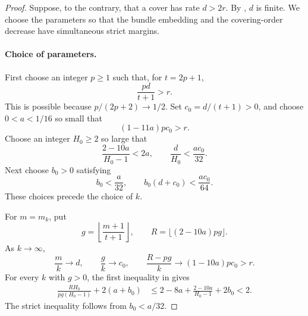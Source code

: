 \begin{proof}
Suppose, to the contrary, that a cover has rate $d>2r$.
By , $d$ is finite.  We choose the
parameters so that the bundle embedding and the covering-order
decrease have simultaneous strict margins.

\paragraph{Choice of parameters.}
First choose an integer $p\ge1$ such that, for $t=2p+1$,
\[
 \frac{pd}{t+1}>r.
\]
This is possible because $p/(2p+2)\to1/2$.  Set
$c_0=d/(t+1)>0$, and choose $0<a<1/16$ so small that
\begin{equation}
\label{eq:cover-a-choice}
 (1-11a)pc_0>r.
\end{equation}
Choose an integer $H_0\ge2$ so large that
\begin{equation}
\label{eq:cover-height-choice}
 \frac{2-10a}{H_0-1}<2a,
 \qquad
 \frac{d}{H_0}<\frac{ac_0}{32}.
\end{equation}
Next choose $b_0>0$ satisfying
\begin{equation}
\label{eq:cover-bad-choice}
 b_0<\frac{a}{32},
 \qquad b_0(d+c_0)<\frac{ac_0}{64}.
\end{equation}
These choices precede the choice of $k$.

For $m=m_k$, put
\begin{equation}
\label{eq:cover-g-r-choice}
 g=\left\lfloor\frac{m+1}{t+1}\right\rfloor,
 \qquad R=\lfloor(2-10a)pg\rfloor.
\end{equation}
As $k\to\infty$,
\[
 \frac{m}{k}\longrightarrow d,
 \qquad \frac{g}{k}\longrightarrow c_0,
 \qquad \frac{R-pg}{k}\longrightarrow(1-10a)pc_0>r.
\]
For every $k$ with $g>0$, the first inequality in
 gives
\begin{align}
\label{eq:cover-comparison-parameters}
 \frac{RH_0}{pg(H_0-1)}+2(a+b_0)
 &\le 2-8a+\frac{2-10a}{H_0-1}+2b_0<2.
\end{align}
The strict inequality follows from $b_0<a/32$.


\end{proof}
